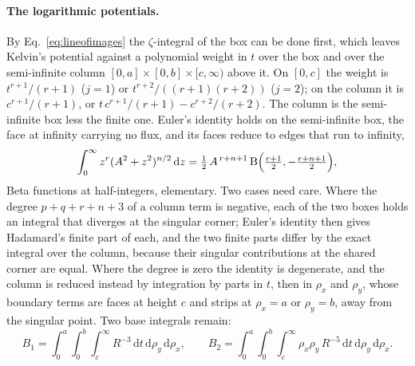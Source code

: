 \documentclass[11pt,a4paper]{article}
\newcommand{\dd}{\mathrm{d}}
\begin{document}
\paragraph{The logarithmic potentials.} By Eq.~\eqref{eq:lineofimages} the $\zeta$-integral of the box can be
done first, which leaves Kelvin's potential against a polynomial weight in $t$ over the box and over the
semi-infinite column $[0,a]\times[0,b]\times[c,\infty)$ above it. On $[0,c]$ the weight is $t^{r+1}/(r+1)$
($j=1$) or $t^{r+2}/((r+1)(r+2))$ ($j=2$); on the column it is $c^{r+1}/(r+1)$, or
$t\,c^{r+1}/(r+1)-c^{r+2}/(r+2)$. The column is the semi-infinite box less the finite one. Euler's identity
holds on the semi-infinite box, the face at infinity carrying no flux, and its faces reduce to edges that
run to infinity,
\begin{equation}\label{eq:lineinf}
  \int_0^\infty z^r(A^2+z^2)^{n/2}\,\dd z=\tfrac12\,A^{\,r+n+1}\,\mathrm B\Bigl(\tfrac{r+1}{2},-\tfrac{r+n+1}{2}\Bigr),
\end{equation}
Beta functions at half-integers, elementary. Two cases need care. Where the degree $p+q+r+n+3$ of a column
term is negative, each of the two boxes holds an integral that diverges at the singular corner; Euler's
identity then gives Hadamard's finite part of each, and the two finite parts differ by the exact integral
over the column, because their singular contributions at the shared corner are equal. Where the degree is
zero the identity is degenerate, and the column is reduced instead by integration by parts in $t$, then in
$\rho_x$ and $\rho_y$, whose boundary terms are faces at height $c$ and strips at $\rho_x=a$ or $\rho_y=b$,
away from the singular point. Two base integrals remain:
\begin{equation}\label{eq:B12}
  B_1=\int_0^a\!\!\int_0^b\!\!\int_c^\infty R^{-3}\,\dd t\,\dd\rho_y\,\dd\rho_x,\qquad
  B_2=\int_0^a\!\!\int_0^b\!\!\int_c^\infty\rho_x\rho_y\,R^{-5}\,\dd t\,\dd\rho_y\,\dd\rho_x .
\end{equation}
\end{document}

